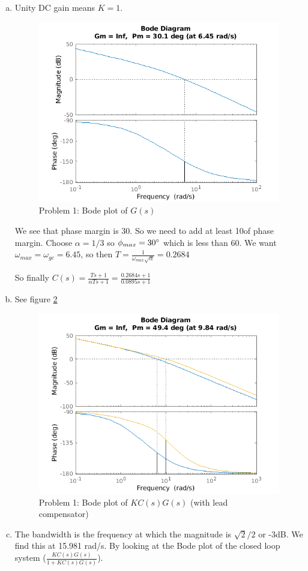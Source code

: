 \documentclass[11pt]{article}
\begin{document}
\begin{enumerate}[a)]
    \item Unity DC gain means $K = 1$. 
    \begin{figure}[h] 
        \centering
        \includegraphics[width=0.55 \linewidth]{p1_bode_1.png}
        \caption{Problem 1: Bode plot of $G(s)$}
        \label{fig:p1_bode_1}
    \end{figure}
    We see that phase margin is 30\degree. 
    So we need to add at least 10\degree of phase margin.
    Choose $\alpha = 1/3$ so $\phi_{max} = 30\degree$ which is less than 60.
    We want $\omega_{max} = \omega_{gc} = 6.45$,
    so then $T = \frac{1}{\omega_{max}\sqrt{\alpha}} = 0.2684$

    So finally $C(s) = \frac{Ts + 1}{\alpha T s + 1} = \frac{0.2684 s + 1}{0.0895s + 1}$
    \item See figure \ref{fig:p1_bode_2} 
    \begin{figure}[h]
        \centering
        \includegraphics[width=0.55 \linewidth]{p1_bode_2.png}
        \caption{Problem 1: Bode plot of $KC(s)G(s)$ (with lead compensator)}
        \label{fig:p1_bode_2}
    \end{figure}

    \item The bandwidth is the frequency at which the magnitude is $\sqrt{2}/2$ or -3dB.
    We find this at 15.981 rad/s. By looking at the Bode plot of the closed loop system ($\frac{KC(s)G(s)}{1 + KC(s)G(s)}$).
    
\end{enumerate}
\end{document}
